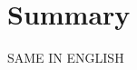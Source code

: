 \chapter{Summary}\label{chap:summary_eng}

\begin{otherlanguage}{USenglish}
	\alert{SAME IN ENGLISH}
\end{otherlanguage}
